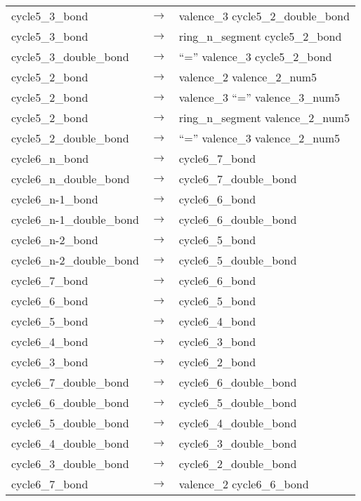 \documentclass[../Document.tex]{subfiles}
\begin{document}
\begin{longtable}{m{} p{} p{}}
    cycle5\_3\_bond & $\rightarrow$ & valence\_3 cycle5\_2\_double\_bond \\
    cycle5\_3\_bond & $\rightarrow$ & ring\_n\_segment cycle5\_2\_bond \\
    cycle5\_3\_double\_bond & $\rightarrow$ & ``='' valence\_3 cycle5\_2\_bond \\
    cycle5\_2\_bond & $\rightarrow$ & valence\_2 valence\_2\_num5 \\
    cycle5\_2\_bond & $\rightarrow$ & valence\_3 ``='' valence\_3\_num5 \\
    cycle5\_2\_bond & $\rightarrow$ & ring\_n\_segment valence\_2\_num5 \\
    cycle5\_2\_double\_bond & $\rightarrow$ & ``='' valence\_3 valence\_2\_num5 \\
    cycle6\_n\_bond & $\rightarrow$ & cycle6\_7\_bond \\
    cycle6\_n\_double\_bond & $\rightarrow$ & cycle6\_7\_double\_bond \\
    cycle6\_n-1\_bond & $\rightarrow$ & cycle6\_6\_bond \\
    cycle6\_n-1\_double\_bond & $\rightarrow$ & cycle6\_6\_double\_bond \\
    cycle6\_n-2\_bond & $\rightarrow$ & cycle6\_5\_bond \\
    cycle6\_n-2\_double\_bond & $\rightarrow$ & cycle6\_5\_double\_bond \\
    cycle6\_7\_bond & $\rightarrow$ & cycle6\_6\_bond \\
    cycle6\_6\_bond & $\rightarrow$ & cycle6\_5\_bond \\
    cycle6\_5\_bond & $\rightarrow$ & cycle6\_4\_bond \\
    cycle6\_4\_bond & $\rightarrow$ & cycle6\_3\_bond \\
    cycle6\_3\_bond & $\rightarrow$ & cycle6\_2\_bond \\
    cycle6\_7\_double\_bond & $\rightarrow$ & cycle6\_6\_double\_bond \\
    cycle6\_6\_double\_bond & $\rightarrow$ & cycle6\_5\_double\_bond \\
    cycle6\_5\_double\_bond & $\rightarrow$ & cycle6\_4\_double\_bond \\
    cycle6\_4\_double\_bond & $\rightarrow$ & cycle6\_3\_double\_bond \\
    cycle6\_3\_double\_bond & $\rightarrow$ & cycle6\_2\_double\_bond \\
    cycle6\_7\_bond & $\rightarrow$ & valence\_2 cycle6\_6\_bond \\

\end{longtable}
\end{document}
